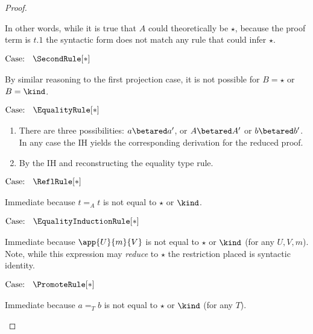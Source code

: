 \begin{proof}
\begin{proofcase}
    In other words, while it is true that $A$ could theoretically be $\star$, because the proof term is $t.1$ the syntactic form does not match any rule that could infer $\star$.
\end{proofcase}

$\text{Case: }\begin{array}{c} \SecondRule[*] \end{array}$
\begin{proofcase}
    By similar reasoning to the first projection case, it is not possible for $B = \star$ or $B = \kind$.
\end{proofcase}

$\text{Case: }\begin{array}{c} \EqualityRule[*] \end{array}$
\begin{proofcase}
    \begin{enumerate}
        \item {
            There are three possibilities: $a \betared a^\prime$, or $A \betared A^\prime$ or $b \betared b^\prime$.
            In any case the IH yields the corresponding derivation for the reduced proof.
        }
        \item By the IH and reconstructing the equality type rule.
    \end{enumerate}
\end{proofcase}

$\text{Case: }\begin{array}{c} \ReflRule[*] \end{array}$
\begin{proofcase}
    Immediate because $t =_A t$ is not equal to $\star$ or $\kind$.
\end{proofcase}

$\text{Case: }\begin{array}{c} \EqualityInductionRule[*] \end{array}$
\begin{proofcase}
    Immediate because $\app{U}{m}{V}$ is not equal to $\star$ or $\kind$ (for any $U, V, m$).
    Note, while this expression may \textit{reduce} to $\star$ the restriction placed is syntactic identity.
\end{proofcase}

$\text{Case: }\begin{array}{c} \PromoteRule[*] \end{array}$
\begin{proofcase}
    Immediate because $a =_T b$ is not equal to $\star$ or $\kind$ (for any $T$).
\end{proofcase}


\end{proof}

